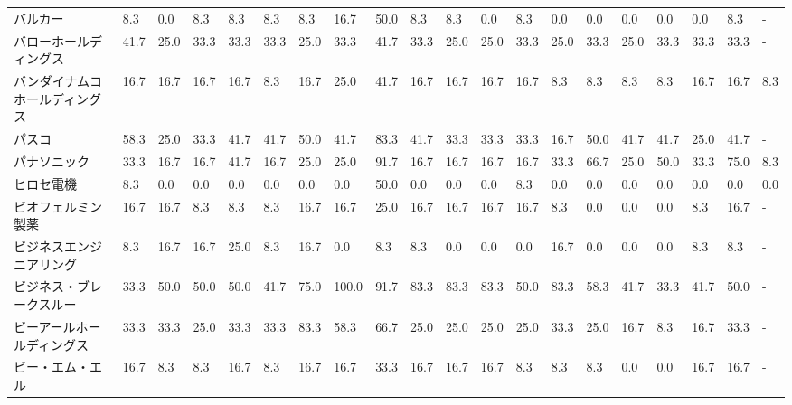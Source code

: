 \documentclass[a4paper，11pt]{jsarticle}
\begin{document}
\begin{longtable}[c]{lp{3mm}p{3mm}p{3mm}p{3mm}p{3mm}p{3mm}p{3mm}p{3mm}p{3mm}p{3mm}p{3mm}p{3mm}p{3mm}p{3mm}p{3mm}p{3mm}p{3mm}p{3mm}p{3mm}}
バルカー            &    8.3 &    0.0 &       8.3 &       8.3 &        8.3 &    8.3 &   16.7 &   50.0 &     8.3 &     8.3 &    0.0 &   8.3 &    0.0 &     0.0 &     0.0 &   0.0 &   0.0 &   8.3 &     - \\
バローホールディングス     &   41.7 &   25.0 &      33.3 &      33.3 &       33.3 &   25.0 &   33.3 &   41.7 &    33.3 &    25.0 &   25.0 &  33.3 &   25.0 &    33.3 &    25.0 &  33.3 &  33.3 &  33.3 &     - \\
バンダイナムコホールディングス &   16.7 &   16.7 &      16.7 &      16.7 &        8.3 &   16.7 &   25.0 &   41.7 &    16.7 &    16.7 &   16.7 &  16.7 &    8.3 &     8.3 &     8.3 &   8.3 &  16.7 &  16.7 &   8.3 \\
パスコ             &   58.3 &   25.0 &      33.3 &      41.7 &       41.7 &   50.0 &   41.7 &   83.3 &    41.7 &    33.3 &   33.3 &  33.3 &   16.7 &    50.0 &    41.7 &  41.7 &  25.0 &  41.7 &     - \\
パナソニック          &   33.3 &   16.7 &      16.7 &      41.7 &       16.7 &   25.0 &   25.0 &   91.7 &    16.7 &    16.7 &   16.7 &  16.7 &   33.3 &    66.7 &    25.0 &  50.0 &  33.3 &  75.0 &   8.3 \\
ヒロセ電機           &    8.3 &    0.0 &       0.0 &       0.0 &        0.0 &    0.0 &    0.0 &   50.0 &     0.0 &     0.0 &    0.0 &   8.3 &    0.0 &     0.0 &     0.0 &   0.0 &   0.0 &   0.0 &   0.0 \\
ビオフェルミン製薬       &   16.7 &   16.7 &       8.3 &       8.3 &        8.3 &   16.7 &   16.7 &   25.0 &    16.7 &    16.7 &   16.7 &  16.7 &    8.3 &     0.0 &     0.0 &   0.0 &   8.3 &  16.7 &     - \\
ビジネスエンジニアリング    &    8.3 &   16.7 &      16.7 &      25.0 &        8.3 &   16.7 &    0.0 &    8.3 &     8.3 &     0.0 &    0.0 &   0.0 &   16.7 &     0.0 &     0.0 &   0.0 &   8.3 &   8.3 &     - \\
ビジネス・ブレークスルー    &   33.3 &   50.0 &      50.0 &      50.0 &       41.7 &   75.0 &  100.0 &   91.7 &    83.3 &    83.3 &   83.3 &  50.0 &   83.3 &    58.3 &    41.7 &  33.3 &  41.7 &  50.0 &     - \\
ビーアールホールディングス   &   33.3 &   33.3 &      25.0 &      33.3 &       33.3 &   83.3 &   58.3 &   66.7 &    25.0 &    25.0 &   25.0 &  25.0 &   33.3 &    25.0 &    16.7 &   8.3 &  16.7 &  33.3 &     - \\
ビー・エム・エル        &   16.7 &    8.3 &       8.3 &      16.7 &        8.3 &   16.7 &   16.7 &   33.3 &    16.7 &    16.7 &   16.7 &   8.3 &    8.3 &     8.3 &     0.0 &   0.0 &  16.7 &  16.7 &     - \\

\end{longtable}
\end{document}

